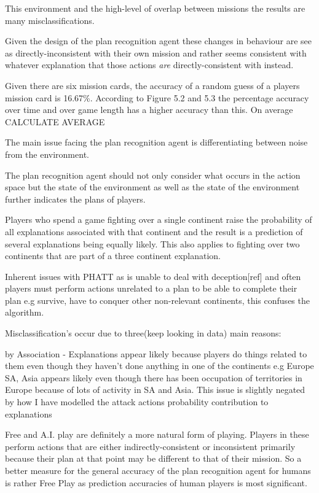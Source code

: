 \documentclass[parskip]{cs4rep}
\begin{document}
This environment and the high-level of overlap between missions the results are many misclassifications.

Given the design of the plan recognition agent these changes in behaviour are see as directly-inconsistent with their own mission and rather seems consistent with whatever explanation that those actions \textit{are} directly-consistent with instead.

Given there are six mission cards, the accuracy of a random guess of a players mission card is 16.67\%. According to Figure 5.2 and 5.3 the percentage accuracy over time and over game length has a higher accuracy than this. On average CALCULATE AVERAGE

The main issue facing the plan recognition agent is differentiating between noise from the environment.

The plan recognition agent should not only consider what occurs in the action space but the state of the environment as well as the state of the environment further indicates the plans of players.

Players who spend a game fighting over a single continent raise the probability of all explanations associated with that continent and the result is a prediction of several explanations being equally likely. This also applies to fighting over two continents that are part of a three continent explanation.

Inherent issues with PHATT as is unable to deal with deception[ref] and often players must perform actions unrelated to a plan to be able to complete their plan e.g survive, have to conquer other non-relevant continents, this confuses the algorithm.

Misclassification's occur due to three(keep looking in data) main reasons:

by Association - Explanations appear likely because players do things related to them even though they haven't done anything in one of the continents e.g Europe SA, Asia appears likely even though there has been occupation of territories in Europe because of lots of activity in SA and Asia. This issue is slightly negated by how I have modelled the attack actions probability contribution to explanations

Free and A.I. play are definitely a more natural form of playing. Players in these perform actions that are either indirectly-consistent or inconsistent primarily because their plan at that point may be different to that of their mission. So a better measure for the general accuracy of the plan recognition  agent for humans is rather Free Play as prediction accuracies of human players is most significant.
\end{document}
